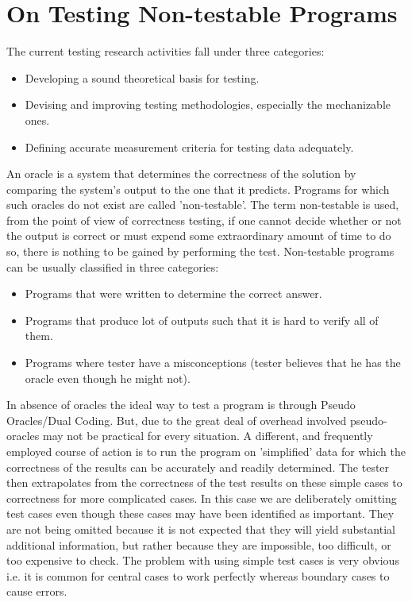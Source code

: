 \section{On Testing Non-testable Programs \cite{Weyuker}}
The current testing research activities fall under three categories:
\begin{itemize}
  \item Developing a sound theoretical basis for testing.
  \item Devising and improving testing methodologies, especially the mechanizable ones.
  \item Defining accurate measurement criteria for testing data adequately.
\end{itemize}
An oracle is a system that determines the correctness of the solution by comparing the system’s output to the one that it predicts. Programs for which such oracles do not exist are called 'non-testable'. The term non-testable is used, from the point of view of correctness testing, if one cannot decide whether or not the output is correct or must expend some extraordinary amount of time to do so, there is nothing to be gained by performing the test.
Non-testable programs can be usually classified in three categories:
\begin{itemize}
  \item Programs that were written to determine the correct answer.
  \item Programs that produce lot of outputs such that it is hard to verify all of them.
  \item Programs where tester have a misconceptions (tester believes that he has the oracle even though he might not).
\end{itemize}
In absence of oracles the ideal way to test a program is through Pseudo Oracles/Dual Coding. But, due to the great deal of overhead involved pseudo-oracles may not be practical for every situation. A different, and frequently employed course of action is to run the program on 'simplified' data for which the correctness of the results can be accurately and readily determined. The tester then extrapolates from the correctness of the test results on these simple cases to correctness for more complicated cases. In this case we are deliberately omitting test cases even though these cases may have been identified as important. They are not being omitted because it is not expected that they will yield substantial additional information, but rather because they are impossible, too difficult, or too expensive to check. The problem with using simple test cases is very obvious i.e. it is common for central cases to work perfectly whereas boundary cases to cause errors.
